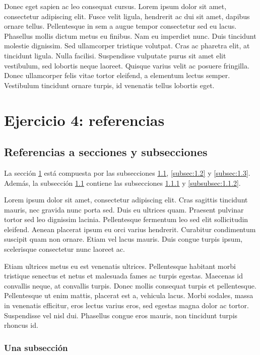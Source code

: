\documentclass[a4paper,10pt]{article}
\theoremstyle{teorema}
\theoremstyle{plano}
\theoremstyle{titulo}
\begin{document}
Donec eget sapien ac leo consequat cursus. Lorem ipsum dolor sit amet, consectetur adipiscing elit. Fusce velit ligula, hendrerit ac dui sit amet, dapibus ornare tellus. Pellentesque in sem a augue tempor consectetur sed eu lacus. Phasellus mollis dictum metus eu finibus. Nam eu imperdiet nunc. Duis tincidunt molestie dignissim. Sed ullamcorper tristique volutpat. Cras ac pharetra elit, at tincidunt ligula. Nulla facilisi. Suspendisse vulputate purus sit amet elit vestibulum, sed lobortis neque laoreet. Quisque varius velit ac posuere fringilla. Donec ullamcorper felis vitae tortor eleifend, a elementum lectus semper. Vestibulum tincidunt ornare turpis, id venenatis tellus lobortis eget.

\section{Ejercicio 4: referencias} \label{sec:1}

\subsection{Referencias a secciones y subsecciones} \label{subsec:1.1}

La sección \ref{sec:1} está compuesta por las subsecciones \ref{subsec:1.1}, \ref{subsec:1.2} y \ref{subsec:1.3}. Además, la subsección \ref{subsec:1.1} contiene las subsecciones \ref{subsubsec:1.1.1} y \ref{subsubsec:1.1.2}.

Lorem ipsum dolor sit amet, consectetur adipiscing elit. Cras sagittis tincidunt mauris, nec gravida nunc porta sed. Duis eu ultrices quam. Praesent pulvinar tortor sed leo dignissim lacinia. Pellentesque fermentum leo sed elit sollicitudin eleifend. Aenean placerat ipsum eu orci varius hendrerit. Curabitur condimentum suscipit quam non ornare. Etiam vel lacus mauris. Duis congue turpis ipsum, scelerisque consectetur nunc laoreet ac.

Etiam ultrices metus eu est venenatis ultrices. Pellentesque habitant morbi tristique senectus et netus et malesuada fames ac turpis egestas. Maecenas id convallis neque, at convallis turpis. Donec mollis consequat turpis et pellentesque. Pellentesque ut enim mattis, placerat est a, vehicula lacus. Morbi sodales, massa in venenatis efficitur, eros lectus varius eros, sed egestas magna dolor ac tortor. Suspendisse vel nisl dui. Phasellus congue eros mauris, non tincidunt turpis rhoncus id.

\subsubsection{Una subsección} \label{subsubsec:1.1.1}
\end{document}
